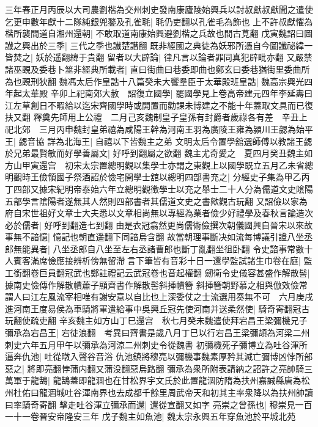 三年春正月丙辰以大司農劉楷為交州刺史發南康廬陵始興兵以討叔獻叔獻聞之遣使乞更申數年獻十二隊純銀兜鍪及孔雀毦|{
	毦仍吏翻以孔雀毛為飾也}
上不許叔獻懼為楷所襲間道自湘州還朝|{
	不敢取道南康始興避劉楷之兵故也間古莧翻}
戊寅魏詔曰圖䜟之興出於三季|{
	三代之季也䜟楚譖翻}
既非經國之典徒為妖邪所憑自今圖䜟祕緯一皆焚之|{
	妖於遥翻緯于貴翻}
留者以大辟論|{
	律凡言以論者罪同真犯辟毗亦翻}
又嚴禁諸巫覡及委巷卜筮非經典所載者|{
	直曰街曲曰巷委即曲也鄭玄曰委巷猶街里委曲所為也覡刑狄翻}
魏馮太后作皇誥十八篇癸未大饗羣臣于太華殿班皇誥|{
	魏高宗興光四年起太華殿}
辛卯上祀南郊大赦　詔復立國學|{
	罷國學見上卷高帝建元四年李延夀曰江左草創日不暇給以迄宋齊國學時或開置而勸課未博建之不能十年蓋取文具而已復扶又翻}
釋奠先師用上公禮　二月己亥魏制皇子皇孫有封爵者歲祿各有差　辛丑上祀北郊　三月丙申魏封皇弟禧為咸陽王幹為河南王羽為廣陵王雍為潁川王勰為始平王|{
	勰音協}
詳為北海王|{
	自禧以下皆魏主之弟}
文明太后令置學舘選師傅以教諸王勰於兄弟最賢敏而好學善屬文|{
	好呼到翻屬之欲翻}
魏主尤奇愛之　夏四月癸丑魏主如方山甲寅還宫　初宋太宗置總明觀以集學士亦謂之東觀上以國學既立五月乙未省總明觀時王儉領國子祭酒詔於儉宅開學士舘以總明四部書充之|{
	分經史子集為甲乙丙丁四部又據宋紀明帝泰始六年立總明觀徵學士以充之舉士二十人分為儒道文史隂陽五部學言隂陽者遂無其人然則四部書者其儒道文史之書歟觀古玩翻}
又詔儉以家為府自宋世祖好文章士大夫悉以文章相尚無以專經為業者儉少好禮學及春秋言論造次必於儒者|{
	好呼到翻造七到翻}
由是衣冠翕然更尚儒術儉撰次朝儀國興自晉宋以來故事無不諳憶|{
	憶記也朝直遥翻下同諳烏含翻}
故當朝理事斷决如流每博議引證八坐丞郎無能異者|{
	八坐丞郎自八坐至左右丞諸曹郎也斷丁亂翻坐徂卧翻}
令史諮事常數十人賓客滿席儉應接辨析傍無留滯言下筆皆有音彩十日一還學監試諸生巾卷在庭|{
	監工銜翻卷巨員翻冠武也鄭註禮記云武冠卷也音起權翻}
劒衛令史儀容甚盛作解散髻|{
	據南史儉傳作解散幘蕭子顯齊書作解散髻斜挿幘簪}
斜挿簪朝野慕之相與倣效儉常謂人曰江左風流宰相唯有謝安意以自比也上深委仗之士流選用奏無不可　六月庚戌進河南王度易侯為車騎將軍遣給事中吳興丘冠先使河南并送柔然使|{
	騎奇寄翻冠古玩翻使疏吏翻}
辛亥魏主如方山丁巳還宫　秋七月癸未魏遣使拜宕昌王梁彌機兄子彌承為宕昌王|{
	宕徒浪翻　考異曰齊書是歲八月丁巳以行宕昌王梁彌頡為河梁二州刺史六年五月甲午以彌承為河涼二州刺史令從魏書}
初彌機死子彌博立為吐谷渾所逼奔仇池|{
	吐從暾入聲谷音浴}
仇池鎮將穆亮以彌機事魏素厚矜其滅亡彌博凶悖所部惡之|{
	將即亮翻悖蒲内翻又蒲没翻惡烏路翻}
彌承為衆所附表請納之詔許之亮帥騎三萬軍于龍鵠|{
	龍鵠蓋即龍涸也在甘松界宇文氏於此置龍涸防隋為扶州嘉誠縣唐為松州杜佑曰龍涸城吐谷渾南界也去成都千餘里周武帝天和初其主率衆降以為扶州帥讀曰率騎奇寄翻}
擊走吐谷渾立彌承而還|{
	還從宣翻又如字}
亮崇之曾孫也|{
	穆崇見一百一十一卷晉安帝隆安三年}
戊子魏主如魚池|{
	魏太宗永興五年穿魚池於平城北苑}

